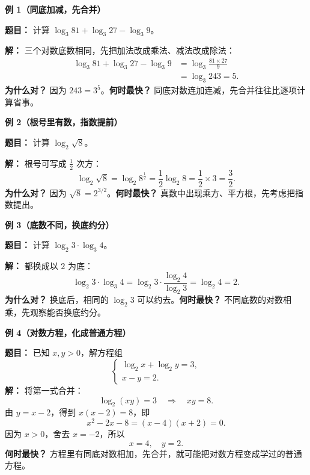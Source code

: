 \begin{examplebox}
	\textbf{\textcolor{CExample}{例 1（同底加减，先合并）}}

	\textbf{题目：} 计算 $\log_3 81+\log_3 27-\log_3 9$。

	\textbf{解：} 三个对数底数相同，先把加法改成乘法、减法改成除法：
	\[
		\begin{aligned}
		\log_3 81+\log_3 27-\log_3 9
		&=\log_3\frac{81\times27}{9}\\
		&=\log_3 243=5.
		\end{aligned}
	\]
	\textbf{为什么对？} 因为 $243=3^5$。\textbf{何时最快？} 同底对数连加连减，先合并往往比逐项计算省事。

	\medskip
	\textbf{\textcolor{CExample}{例 2（根号里有数，指数提前）}}

	\textbf{题目：} 计算 $\log_2\sqrt8$。

	\textbf{解：} 根号可写成 $\frac12$ 次方：
	\[
		\log_2\sqrt8=\log_2 8^{\frac12}
		=\frac12\log_2 8=\frac12\times3=\boxed{\frac32}.
	\]
	\textbf{为什么对？} 因为 $\sqrt8=2^{3/2}$。\textbf{何时最快？} 真数中出现乘方、平方根，先考虑把指数提出。

	\medskip
	\textbf{\textcolor{CExample}{例 3（底数不同，换底约分）}}

	\textbf{题目：} 计算 $\log_2 3\cdot\log_3 4$。

	\textbf{解：} 都换成以 $2$ 为底：
	\[
		\log_2 3\cdot\log_3 4
		=\log_2 3\cdot\frac{\log_2 4}{\log_2 3}
		=\log_2 4=\boxed{2}.
	\]
	\textbf{为什么对？} 换底后，相同的 $\log_2 3$ 可以约去。\textbf{何时最快？} 不同底数的对数相乘，先观察能否换底约分。

	\medskip
	\textbf{\textcolor{CExample}{例 4（对数方程，化成普通方程）}}

	\textbf{题目：} 已知 $x,y>0$，解方程组
	\[
		\begin{cases}
			\log_2 x+\log_2 y=3,\\
			x-y=2.
		\end{cases}
	\]
	\textbf{解：} 将第一式合并：
	\[
		\log_2(xy)=3\quad\Longrightarrow\quad xy=8.
	\]
	由 $y=x-2$，得到 $x(x-2)=8$，即
	\[
		x^2-2x-8=(x-4)(x+2)=0.
	\]
	因为 $x>0$，舍去 $x=-2$，所以
	\[
		\boxed{x=4,\quad y=2}.
	\]
	\textbf{何时最快？} 方程里有同底对数相加，先合并，就可能把对数方程变成学过的普通方程。
\end{examplebox}
